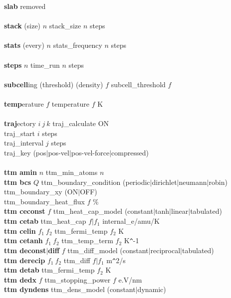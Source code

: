 \begin{tabbing}
\>    {\bf slab} \> removed \\\\
\>    {\bf stack} (size) $n$ \> stack\_size $n$ steps \\\\
\>    {\bf stats} (every) $n$ \> stats\_frequency $n$ steps \\\\
\>    {\bf steps} $n$ \> time\_run $n$ steps \\\\
\>    {\bf subcell}ing (threshold) (density) $f$ \> \phantom{xxxx} subcell\_threshold $f$ \\\\
\>    {\bf temp}erature $f$ \> temperature $f$ K \\\\
\>    {\bf traj}ectory $i~j~k$ \> traj\_calculate ON \\
\> \> traj\_start $i$ steps \\
\> \> traj\_interval $j$ steps \\
\> \> traj\_key (pos$|$pos-vel$|$pos-vel-force$|$compressed) \\\\
\>    {\bf ttm amin} $n$ \> ttm\_min\_atoms $n$ \\
\>    {\bf ttm bcs} $Q$ \> ttm\_boundary\_condition (periodic$|$dirichlet$|$neumann$|$robin) \\
\> \> ttm\_boundary\_xy (ON$|$OFF) \\
\> \> ttm\_boundary\_heat\_flux $f$ \% \\
\>    {\bf ttm ceconst} $f$ \> ttm\_heat\_cap\_model (constant$|$tanh$|$linear$|$tabulated) \\
\>    {\bf ttm cetab} \> ttm\_heat\_cap $f|f_{1}$ internal\_e/amu/K \\
\>    {\bf ttm celin} $f_{1}~f_{2}$ \> ttm\_fermi\_temp $f_{2}$ K \\
\>    {\bf ttm cetanh} $f_{1}~f_{2}$ \> ttm\_temp\_term $f_{2}$ K\verb#^#-1 \\
\>    {\bf ttm deconst}$|${\bf diff} $f$ \> ttm\_diff\_model (constant$|$reciprocal$|$tabulated) \\
\>    {\bf ttm derecip} $f_{1}~f_{2}$ \> ttm\_diff $f|f_{1}$ m\verb#^#2/s \\
\>    {\bf ttm detab} \> ttm\_fermi\_temp $f_{2}$ K \\
\>    {\bf ttm dedx} $f$ \> ttm\_stopping\_power $f$ e.V/nm \\
\>    {\bf ttm dyndens} \> ttm\_dens\_model (constant$|$dynamic) \\

\end{tabbing}
